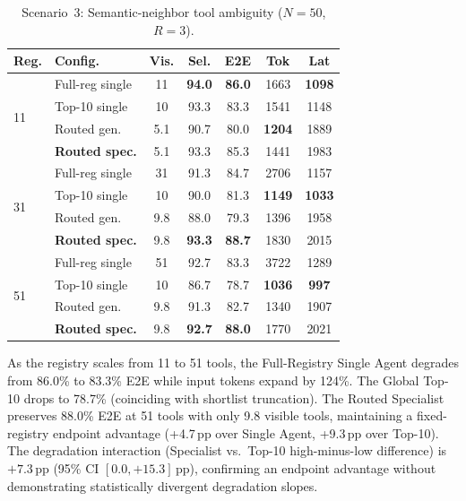 \begin{table}[!htbp]
\centering
\caption{Scenario~3: Semantic-neighbor tool ambiguity ($N=50$, $R=3$).}
\label{tab:tool_ambiguity}
{\small\setlength{\tabcolsep}{3pt}
\begin{tabular}{llccccc}
\toprule
\textbf{Reg.} & \textbf{Config.} & \textbf{Vis.} & \textbf{Sel.} & \textbf{E2E} & \textbf{Tok} & \textbf{Lat} \\
\midrule
\multirow{4}{*}{11} & Full-reg single & 11 & \textbf{94.0} & \textbf{86.0} & 1663 & \textbf{1098} \\
 & Top-10 single   & 10 & 93.3 & 83.3 & 1541 & 1148 \\
 & Routed gen.     & 5.1 & 90.7 & 80.0 & \textbf{1204} & 1889 \\
 & \textbf{Routed spec.} & 5.1 & 93.3 & 85.3 & 1441 & 1983 \\
\midrule
\multirow{4}{*}{31} & Full-reg single & 31 & 91.3 & 84.7 & 2706 & 1157 \\
 & Top-10 single   & 10 & 90.0 & 81.3 & \textbf{1149} & \textbf{1033} \\
 & Routed gen.     & 9.8 & 88.0 & 79.3 & 1396 & 1958 \\
 & \textbf{Routed spec.} & 9.8 & \textbf{93.3} & \textbf{88.7} & 1830 & 2015 \\
\midrule
\multirow{4}{*}{51} & Full-reg single & 51 & 92.7 & 83.3 & 3722 & 1289 \\
 & Top-10 single   & 10 & 86.7 & 78.7 & \textbf{1036} & \textbf{997} \\
 & Routed gen.     & 9.8 & 91.3 & 82.7 & 1340 & 1907 \\
 & \textbf{Routed spec.} & 9.8 & \textbf{92.7} & \textbf{88.0} & 1770 & 2021 \\
\bottomrule
\end{tabular}}
\end{table}

As the registry scales from 11 to 51 tools, the Full-Registry Single Agent degrades from 86.0\% to 83.3\% E2E while input tokens expand by 124\%. The Global Top-10 drops to 78.7\% (coinciding with shortlist truncation). The Routed Specialist preserves 88.0\% E2E at 51 tools with only 9.8 visible tools, maintaining a fixed-registry endpoint advantage (+4.7\,pp over Single Agent, +9.3\,pp over Top-10). The degradation interaction (Specialist vs.\ Top-10 high-minus-low difference) is $+7.3$\,pp (95\% CI $[0.0, +15.3]$\,pp), confirming an endpoint advantage without demonstrating statistically divergent degradation slopes.

